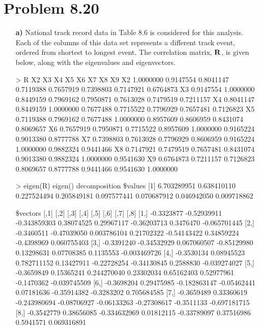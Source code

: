 


\maketitle

\section*{Problem 8.20} 
\begin{enumerate}
\item[\bf{a)}]
	National track record data in Table 8.6 is considered for this analysis. Each of the columns of this data set represents a different track event, ordered from shortest to longest event. The correlation matrix, $\mathrm{\bf{R}}$, is given below, along with the eigenvalues and eigenvectors.

\begin{rc}

> R
          X2        X3        X4        X5        X6        X7        X8        X9
X2 1.0000000 0.9147554 0.8041147 0.7119388 0.7657919 0.7398803 0.7147921 0.6764873
X3 0.9147554 1.0000000 0.8449159 0.7969162 0.7950871 0.7613028 0.7479519 0.7211157
X4 0.8041147 0.8449159 1.0000000 0.7677488 0.7715522 0.7796929 0.7657481 0.7126823
X5 0.7119388 0.7969162 0.7677488 1.0000000 0.8957609 0.8606959 0.8431074 0.8069657
X6 0.7657919 0.7950871 0.7715522 0.8957609 1.0000000 0.9165224 0.9013380 0.8777788
X7 0.7398803 0.7613028 0.7796929 0.8606959 0.9165224 1.0000000 0.9882324 0.9441466
X8 0.7147921 0.7479519 0.7657481 0.8431074 0.9013380 0.9882324 1.0000000 0.9541630
X9 0.6764873 0.7211157 0.7126823 0.8069657 0.8777788 0.9441466 0.9541630 1.0000000

> eigen(R)
eigen() decomposition
\$values
[1] 6.703289951 0.638410110 0.227524494 0.205849181 0.097577441 0.070687912 0.046942050 0.009718862

\$vectors
           [,1]        [,2]         [,3]        [,4]        [,5]        [,6]       [,7]         [,8]
[1,] -0.3323877 -0.52939911 -0.343859303  0.38074525  0.29967117 -0.36203713  0.3476470 -0.065701445
[2,] -0.3460511 -0.47039050  0.003786104  0.21702322 -0.54143422  0.34859224 -0.4398969  0.060755403
[3,] -0.3391240 -0.34532929  0.067060507 -0.85129980  0.13298631  0.07708385  0.1135553 -0.003469726
[4,] -0.3530134  0.08945523  0.782711152  0.13427911 -0.22728254 -0.34130845  0.2588830 -0.039274027
[5,] -0.3659849  0.15365241  0.244270040  0.23302034  0.65162403  0.52977961 -0.1470362 -0.039745509
[6,] -0.3698204  0.29475985 -0.182863147 -0.05462441  0.07181636 -0.35914382 -0.3283202  0.705684585
[7,] -0.3659489  0.33360619 -0.243980694 -0.08706927 -0.06133263 -0.27308617 -0.3511133 -0.697181715
[8,] -0.3542779  0.38656085 -0.334632969  0.01812115 -0.33789097  0.37516986  0.5941571  0.069316891
\end{rc}


\end{enumerate}
